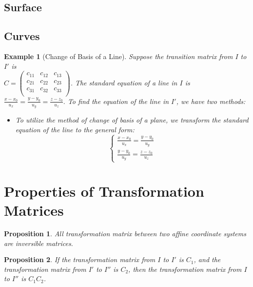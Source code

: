 \documentclass[onecolumn]{ctexart}
\newtheorem{proposition}{Proposition}
\newtheorem{example}{Example}
\begin{document}
\subsection{Surface}

\subsection{Curves}

\begin{example}[Change of Basis of a Line]
  Suppose the transition matrix from $I$ to $I'$ is \\ $C = 
  \begin{pmatrix}
    c_{11} & c_{12} & c_{13} \\
    c_{21} & c_{22} & c_{23} \\
    c_{31} & c_{32} & c_{33} \\
  \end{pmatrix}$. The standard equation of a line in $I$ is $\frac{x - x_0}{u_x} 
  = \frac{y - y_0}{u_y} = \frac{z - z_0}{u_z}$. To find the equation of the line 
  in $I'$, we have two methods:
  \begin{itemize}
    \item To utilize the method of change of basis of a plane, we transform the 
    standard equation of the line to the general form:
    \[
      \begin{cases}
        \frac{x - x_0}{u_x} = \frac{y - y_0}{u_y} \\
        \frac{y - y_0}{u_y} = \frac{z - z_0}{u_z}
      \end{cases}
    \]
  \end{itemize}
\end{example}


\section{Properties of Transformation Matrices}

\begin{proposition}
  All transformation matrix between two affine coordinate systems are inversible 
  matrices.
\end{proposition}

\begin{proposition}
  If the transformation matrix from $I$ to $I'$ is $C_1$, and the transformation 
  matrix from $I'$ to $I''$ is $C_2$, then the transformation matrix from $I$ to 
  $I''$ is $C_1C_2$.
\end{proposition}
\end{document}
